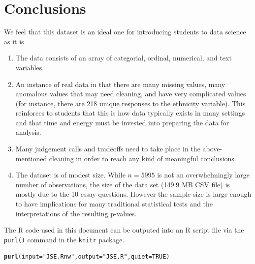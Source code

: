 \documentclass{article}\usepackage[]{graphicx}\usepackage[]{color}
\makeatletter
\newcommand{\hlnum}[1]{\textcolor[rgb]{0.686,0.059,0.569}{#1}}%
\newcommand{\hlstr}[1]{\textcolor[rgb]{0.192,0.494,0.8}{#1}}%
\newcommand{\hlstd}[1]{\textcolor[rgb]{0.345,0.345,0.345}{#1}}%
\newcommand{\hlkwc}[1]{\textcolor[rgb]{0.333,0.667,0.333}{#1}}%
\newcommand{\hlkwd}[1]{\textcolor[rgb]{0.737,0.353,0.396}{\textbf{#1}}}%
\newenvironment{kframe}{%
 \def\at@end@of@kframe{}%
 \ifinner\ifhmode%
  \def\at@end@of@kframe{\end{minipage}}%
  \begin{minipage}{\columnwidth}%
 \fi\fi%
 \def\FrameCommand##1{\hskip\@totalleftmargin \hskip-\fboxsep
 \colorbox{shadecolor}{##1}\hskip-\fboxsep
     \hskip-\linewidth \hskip-\@totalleftmargin \hskip\columnwidth}%
 \MakeFramed {\advance\hsize-\width
   \@totalleftmargin\z@ \linewidth\hsize
   \@setminipage}}%
 {\par\unskip\endMakeFramed%
 \at@end@of@kframe}
\newenvironment{knitrout}{}{} %
\makeatother
\begin{document}
\section{Conclusions}
%
We feel that this dataset is an ideal one for introducing students to data science as it is
\begin{enumerate}
\item The data consists of an array of categorial, ordinal, numerical, and text variables.
\item An instance of real data in that there are many missing values, many anomalous values that may need cleaning, and have very complicated values (for instance, there are 218 unique responses to the ethnicity variable).  This reinforces to students that this is how data typically exists in many settings and that time and energy must be invested into preparing the data for analysis. 
\item Many judgement calls and tradeoffs need to take place in the above-mentioned cleaning in order to reach any kind of meaningful conclusions.  
\item The dataset is of modest size.  While $n = 5995$ is not an overwhelmingly large number of observations, the size of the data set (149.9 MB CSV file) is mostly due to the 10 essay questions.  However the sample size is large enough to have implications for many traditional statistical tests and the interpretations of the resulting p-values.  
\end{enumerate}




The R code used in this document can be outputed into an R script file via the \verb#purl()# command in the \verb#knitr# package.
\begin{knitrout}
\color{fgcolor}\begin{kframe}
\begin{alltt}
\hlkwd{purl}\hlstd{(}\hlkwc{input}\hlstd{=}\hlstr{"JSE.Rnw"}\hlstd{,} \hlkwc{output}\hlstd{=}\hlstr{"JSE.R"}\hlstd{,} \hlkwc{quiet}\hlstd{=}\hlnum{TRUE}\hlstd{)}
\end{alltt}
\end{kframe}
\end{knitrout}
\end{document}
